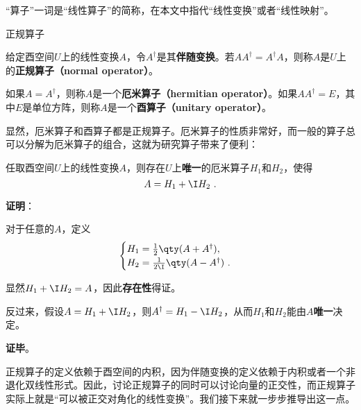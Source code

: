 




“算子”一词是“线性算子”的简称，在本文中指代“线性变换”或者“线性映射”。


\begin{definition}{正规算子}

给定酉空间$U$上的线性变换$A$，令$A^\dagger$是其\textbf{伴随变换}。若$AA^\dagger = A^\dagger A$，则称$A$是$U$上的\textbf{正规算子（normal operator）}。

如果$A=A^\dagger$，则称$A$是一个\textbf{厄米算子（hermitian operator）}。如果$AA^\dagger = E$，其中$E$是单位方阵，则称$A$是一个\textbf{酉算子（unitary operator）}。

\end{definition}


显然，厄米算子和酉算子都是正规算子。厄米算子的性质非常好，而一般的算子总可以分解为厄米算子的组合，这就为研究算子带来了便利：



\begin{lemma}{}
任取酉空间$U$上的线性变换$A$，则存在$U$上\textbf{唯一}的厄米算子$H_1$和$H_2$，使得
\begin{equation}
A = H_1 + \I H_2~. 
\end{equation}
\end{lemma}


\textbf{证明}：

对于任意的$A$，定义
\begin{equation}
\begin{cases}
H_1 =\frac{1}{2}\qty(A+A^\dagger), \\
H_2 =\frac{1}{2\I}\qty(A-A^\dagger)~. 
\end{cases}
\end{equation}

显然$H_1+\I H_2=A$，因此\textbf{存在性}得证。

反过来，假设$A = H_1 + \I H_2$，则$A^\dagger = H_1 - \I H_2$，从而$H_1$和$H_2$能由$A$\textbf{唯一}决定。

\textbf{证毕}。




正规算子的定义依赖于酉空间的内积，因为伴随变换的定义依赖于内积或者一个非退化双线性形式。因此，讨论正规算子的同时可以讨论向量的正交性，而正规算子实际上就是“可以被正交对角化的线性变换”。我们接下来就一步步推导出这一点。





